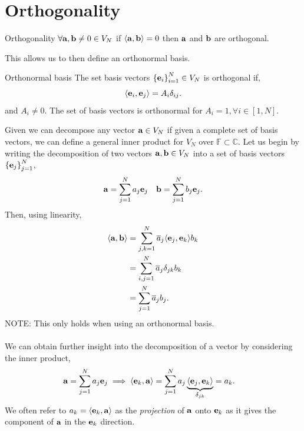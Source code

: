 \documentclass{book}
\def\innerproduct#1#2{\langle#1,#2\rangle}
\begin{document}
\section{Orthogonality}
\begin{Definitions}{Orthogonality}{}
	$\forall \vb{a},\vb{b} \neq 0 \in V_N$ if $\innerproduct{\vb{a}}{\vb{b}} = 0$ then $\vb{a}$ and $\vb{b}$ are orthogonal.
\end{Definitions}
This allows us to then define an orthonormal basis.
\begin{Definitions}{Orthonormal basis}{}
	The set basis vectors $\left\{\vb{e}_i\right\}_{i=1}^N \in V_N$ is orthogonal if,
	\begin{equation}
		\innerproduct{\vb{e}_i}{\vb{e}_j} = A_i\delta_{ij}.
	\end{equation}
	and $A_i \neq 0$. The set of basis vectors is orthonormal for $A_i = 1, \forall i \in \left[1,N\right]$.
\end{Definitions}
Given we can decompose any vector $\vb{a} \in V_N$ if given a complete set of basis vectors, we can define a general inner product for $V_N$ over $\mathbb{F} \subset \mathbb{C}$. Let us begin by writing the decomposition of two vectors $\vb{a},\vb{b}\in V_N$ into a set of basis vectors $\left\{\vb{e}_j\right\}_{j=1}^N$,
\begin{align}
	\vb{a} = \sum_{j=1}^Na_j\vb{e}_j && \vb{b} = \sum_{j=1}^Nb_j\vb{e}_j.
\end{align}
Then, using linearity,
\begin{equation}
	\begin{split}
		\innerproduct{\vb{a}}{\vb{b}} & = \sum_{j,k=1}^N\overline{a}_j \innerproduct{\vb{e}_j}{\vb{e}_k}b_k \\
		& = \sum_{i,j=1}^N\overline{a}_j\delta_{jk}b_k \\
		& = \sum_{j=1}^N\overline{a}_jb_j.
	\end{split}
\end{equation}
NOTE: This only holds when using an orthonormal basis.
\\\\
We can obtain further insight into the decomposition of a vector by considering the inner product,
\begin{equation}
	\begin{split}
		\vb{a} = \sum_{j=1}^Na_j\vb{e}_j \implies \innerproduct{\vb{e}_k}{\vb{a}} & = \sum_{j=1}^Na_j\underbrace{\innerproduct{\vb{e}_j}{\vb{e}_k}}_{\delta_{jk}} = a_k.
	\end{split}
\end{equation}
We often refer to $a_k = \innerproduct{\vb{e}_k}{\vb{a}}$ as the \textit{projection} of $\vb{a}$ onto $\vb{e}_k$ as it gives the component of $\vb{a}$ in the $\vb{e}_k$ direction.
\end{document}
